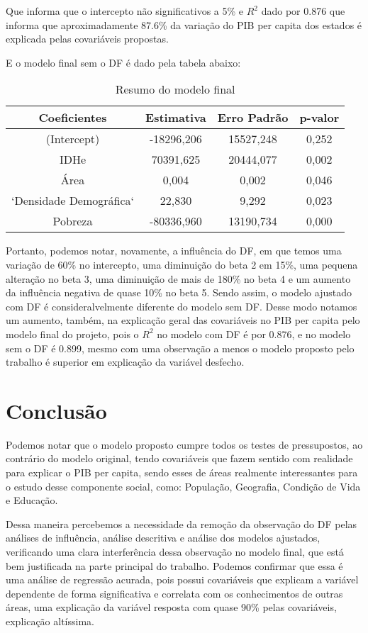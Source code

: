 \documentclass[
]{article}
\begin{document}
Que informa que o intercepto não significativos a 5\% e \(R^2\) dado por 0.876 que informa que aproximadamente 87.6\% da variação do PIB per capita dos estados é explicada pelas covariáveis propostas.

E o modelo final sem o DF é dado pela tabela abaixo:

\begin{table}[H]

\caption{\label{tab:unnamed-chunk-9}Resumo do modelo final}
\centering
\begin{tabular}[t]{c|c|c|c}
\hline
Coeficientes & Estimativa & Erro Padrão & p-valor\\
\hline
(Intercept) & -18296,206 & 15527,248 & 0,252\\
\hline
IDHe & 70391,625 & 20444,077 & 0,002\\
\hline
Área & 0,004 & 0,002 & 0,046\\
\hline
`Densidade Demográfica` & 22,830 & 9,292 & 0,023\\
\hline
Pobreza & -80336,960 & 13190,734 & 0,000\\
\hline
\end{tabular}
\end{table}

Portanto, podemos notar, novamente, a influência do DF, em que temos uma variação de 60\% no intercepto, uma diminuição do beta 2 em 15\%, uma pequena alteração no beta 3, uma diminuição de mais de 180\% no beta 4 e um aumento da influência negativa de quase 10\% no beta 5. Sendo assim, o modelo ajustado com DF é consideralvelmente diferente do modelo sem DF.
Desse modo notamos um aumento, também, na explicação geral das covariáveis no PIB per capita pelo modelo final do projeto, pois o \(R^2\) no modelo com DF é por 0.876, e no modelo sem o DF é 0.899, mesmo com uma observação a menos o modelo proposto pelo trabalho é superior em explicação da variável desfecho.

\section{Conclusão}

Podemos notar que o modelo proposto cumpre todos os testes de pressupostos, ao contrário do modelo original, tendo covariáveis que fazem sentido com realidade para explicar o PIB per capita, sendo esses de áreas realmente interessantes para o estudo desse componente social, como: População, Geografia, Condição de Vida e Educação.

Dessa maneira percebemos a necessidade da remoção da observação do DF pelas análises de influência, análise descritiva e análise dos modelos ajustados, verificando uma clara interferência dessa observação no modelo final, que está bem justificada na parte principal do trabalho. Podemos confirmar que essa é uma análise de regressão acurada, pois possui covariáveis que explicam a variável dependente de forma significativa e correlata com os conhecimentos de outras áreas, uma explicação da variável resposta com quase 90\% pelas covariáveis, explicação altíssima.
\end{document}
